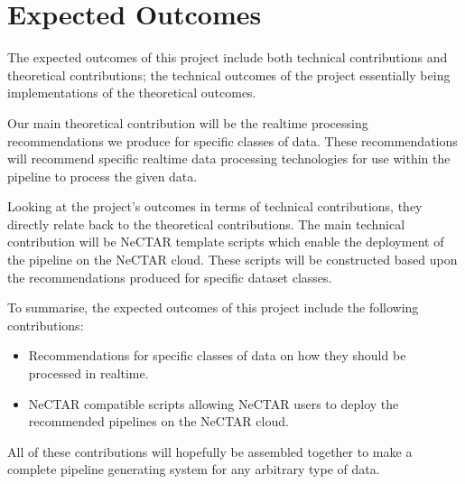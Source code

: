 \documentclass[a4paper,11pt]{article}
\begin{document}



\newpage


\section{Expected Outcomes} %
\label{sec:expected_outcomes}

The expected outcomes of this project include both technical contributions and theoretical contributions; the technical
outcomes of the project essentially being implementations of the theoretical outcomes.

Our main theoretical contribution will be the realtime processing recommendations we produce for specific classes of
data. These recommendations will recommend specific realtime data processing technologies for use within the pipeline to
process the given data.

Looking at the project's outcomes in terms of technical contributions, they directly relate back to the theoretical
contributions. The main technical contribution will be NeCTAR template scripts which enable the deployment of the
pipeline on the NeCTAR cloud. These scripts will be constructed based upon the recommendations produced for specific
dataset classes.

To summarise, the expected outcomes of this project include the following contributions:

\begin{itemize}
  \item Recommendations for specific classes of data on how they should be processed in realtime.
  \item NeCTAR compatible scripts allowing NeCTAR users to deploy the recommended pipelines on the NeCTAR cloud.
\end{itemize}

All of these contributions will hopefully be assembled together to make a complete pipeline generating system for any
arbitrary type of data.



\newpage



\end{document}
